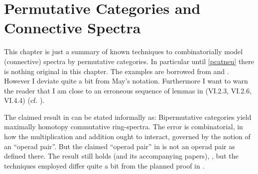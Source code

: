 \chapter{Permutative Categories and Connective Spectra}
\pagestyle{headings} 
This chapter is just a summary of known techniques to combinatorially
model (connective) spectra by permutative categories. In particular
until \ref{pcatneu} there is nothing original in this chapter. 
The examples are borrowed from \cite[pp. 160-167]{MayEinf} and 
\cite[pp. 337+338]{Ri2010}. However I deviate quite a bit
from May's notation. Furthermore I want to warn the reader that I am 
close to an erroneous sequence of lemmas in \cite{MayEinf} 
(VI.2.3, VI.2.6, VI.4.4) (cf. \cite[p. 321]{May2009}). 

The claimed result in \cite{MayEinf} can be stated informally as: 
Bipermutative categories yield maximally homotopy commutative ring-spectra. 
The error is combinatorial, in how the multiplication and 
addition ought to interact, governed by the notion of an 
``operad pair''. But the claimed ``operad pair'' in \cite{MayEinf} is
not an operad pair as defined there. The result still holds \cite{May2009} 
(and its accompanying papers), \cite{EM}, but the techniques employed differ 
quite a bit from the planned proof in \cite{MayEinf}.

